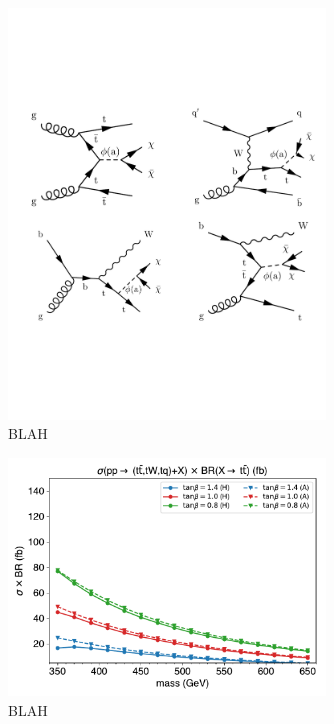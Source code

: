 \begin{figure}[htb!]
    \centering
    \includegraphics[width=0.75\textwidth]{figs/ftan/bsm_dm_diagrams}
\caption{BLAH}
\label{fig:dm_diagrams}
\end{figure}

\begin{figure}[htb!]
    \centering
    \includegraphics[width=0.75\textwidth]{figs/ftan/plot_1d_2hdm_xsec}
\caption{BLAH}
\label{fig:thdm_1d_xsec}
\end{figure}

